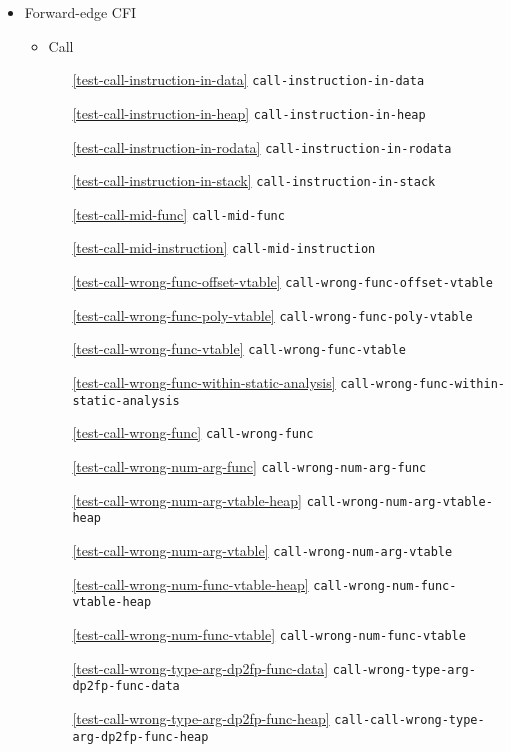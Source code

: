\documentclass[a4paper]{book}
\begin{document}
\begin{itemize}[noitemsep]
\item Forward-edge CFI
  \begin{itemize}[noitemsep, nolistsep, leftmargin=1em]
  \item Call
    \begin{itemize}[noitemsep, nolistsep, leftmargin=1em]
    \item[\ref{test-call-instruction-in-data}]        \texttt{call-instruction-in-data}
    \item[\ref{test-call-instruction-in-heap}]        \texttt{call-instruction-in-heap}
    \item[\ref{test-call-instruction-in-rodata}]      \texttt{call-instruction-in-rodata}
    \item[\ref{test-call-instruction-in-stack}]       \texttt{call-instruction-in-stack}
    \item[\ref{test-call-mid-func}]                   \texttt{call-mid-func}
    \item[\ref{test-call-mid-instruction}]            \texttt{call-mid-instruction}
    \item[\ref{test-call-wrong-func-offset-vtable}]   \texttt{call-wrong-func-offset-vtable}
    \item[\ref{test-call-wrong-func-poly-vtable}]     \texttt{call-wrong-func-poly-vtable}
    \item[\ref{test-call-wrong-func-vtable}]          \texttt{call-wrong-func-vtable}
    \item[\ref{test-call-wrong-func-within-static-analysis}]          \texttt{call-wrong-func-within-static-analysis}
    \item[\ref{test-call-wrong-func}]         \texttt{call-wrong-func}
    \item[\ref{test-call-wrong-num-arg-func}]         \texttt{call-wrong-num-arg-func}
    \item[\ref{test-call-wrong-num-arg-vtable-heap}]  \texttt{call-wrong-num-arg-vtable-heap}
    \item[\ref{test-call-wrong-num-arg-vtable}]       \texttt{call-wrong-num-arg-vtable}
    \item[\ref{test-call-wrong-num-func-vtable-heap}] \texttt{call-wrong-num-func-vtable-heap}
    \item[\ref{test-call-wrong-num-func-vtable}]      \texttt{call-wrong-num-func-vtable}
    \item[\ref{test-call-wrong-type-arg-dp2fp-func-data}]      \texttt{call-wrong-type-arg-dp2fp-func-data}
    \item[\ref{test-call-wrong-type-arg-dp2fp-func-heap}]      \texttt{call-call-wrong-type-arg-dp2fp-func-heap}

\end{itemize}
\end{itemize}
\end{itemize}
\end{document}
